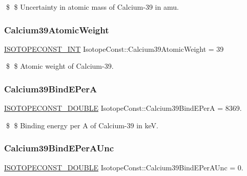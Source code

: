 \$ \$ Uncertainty in atomic mass of Calcium-\/39 in amu. \mbox{\label{group___isotope_const-_calcium-_ca39_ga935e5bd1d1d3d650021b36c6d41282bb}} 
\subsubsection{\texorpdfstring{Calcium39\+Atomic\+Weight}{Calcium39AtomicWeight}}
{\footnotesize\ttfamily \mbox{\hyperlink{group___isotope_const-_macros_ga5f18360b3e99483a35c32d789e62621c}{I\+S\+O\+T\+O\+P\+E\+C\+O\+N\+S\+T\+\_\+\+I\+NT}} Isotope\+Const\+::\+Calcium39\+Atomic\+Weight = 39}

\$ \$ Atomic weight of Calcium-\/39. \mbox{\label{group___isotope_const-_calcium-_ca39_ga3b10292e404fcd279bb0866918ee5a3c}} 
\subsubsection{\texorpdfstring{Calcium39\+Bind\+E\+PerA}{Calcium39BindEPerA}}
{\footnotesize\ttfamily \mbox{\hyperlink{group___isotope_const-_macros_ga8f45a7272ce02c0b4c65c44636ed719a}{I\+S\+O\+T\+O\+P\+E\+C\+O\+N\+S\+T\+\_\+\+D\+O\+U\+B\+LE}} Isotope\+Const\+::\+Calcium39\+Bind\+E\+PerA = 8369.}

\$ \$ Binding energy per A of Calcium-\/39 in keV. \mbox{\label{group___isotope_const-_calcium-_ca39_ga573394887b07ca90fa74f5f381b5742b}} 
\subsubsection{\texorpdfstring{Calcium39\+Bind\+E\+Per\+A\+Unc}{Calcium39BindEPerAUnc}}
{\footnotesize\ttfamily \mbox{\hyperlink{group___isotope_const-_macros_ga8f45a7272ce02c0b4c65c44636ed719a}{I\+S\+O\+T\+O\+P\+E\+C\+O\+N\+S\+T\+\_\+\+D\+O\+U\+B\+LE}} Isotope\+Const\+::\+Calcium39\+Bind\+E\+Per\+A\+Unc = 0.}

